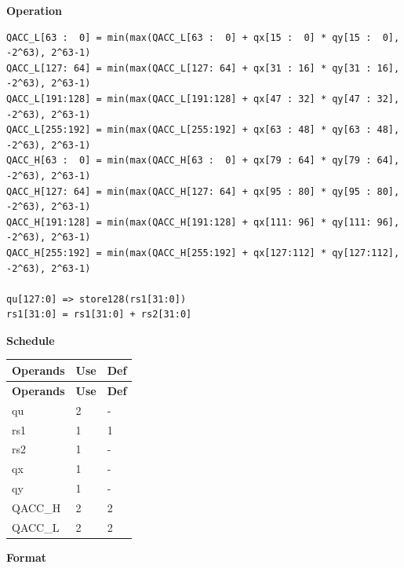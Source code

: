 \textbf{Operation}\\
\begin{lstlisting}
QACC_L[63 :  0] = min(max(QACC_L[63 :  0] + qx[15 :  0] * qy[15 :  0], -2^63), 2^63-1)
QACC_L[127: 64] = min(max(QACC_L[127: 64] + qx[31 : 16] * qy[31 : 16], -2^63), 2^63-1)
QACC_L[191:128] = min(max(QACC_L[191:128] + qx[47 : 32] * qy[47 : 32], -2^63), 2^63-1)
QACC_L[255:192] = min(max(QACC_L[255:192] + qx[63 : 48] * qy[63 : 48], -2^63), 2^63-1)
QACC_H[63 :  0] = min(max(QACC_H[63 :  0] + qx[79 : 64] * qy[79 : 64], -2^63), 2^63-1)
QACC_H[127: 64] = min(max(QACC_H[127: 64] + qx[95 : 80] * qy[95 : 80], -2^63), 2^63-1)
QACC_H[191:128] = min(max(QACC_H[191:128] + qx[111: 96] * qy[111: 96], -2^63), 2^63-1)
QACC_H[255:192] = min(max(QACC_H[255:192] + qx[127:112] * qy[127:112], -2^63), 2^63-1)

qu[127:0] => store128(rs1[31:0])
rs1[31:0] = rs1[31:0] + rs2[31:0]
\end{lstlisting}

\textbf{Schedule}\\
\begin{longtable}[c]{|l|l|l|}
    \hline
    \rowcolor{lightgray}
    \textbf{Operands} & \textbf{Use} & \textbf{Def} \\\hline
    \endfirsthead
    \hline
    \rowcolor{lightgray}
     \textbf{Operands} & \textbf{Use} & \textbf{Def} \\\hline
    \endhead
    \hline
    \endfoot

    qu & 2 & - \\\hline
    rs1 & 1 & 1 \\\hline
    rs2 & 1 & - \\\hline
     qx & 1 & - \\\hline
     qy & 1 & - \\\hline
     QACC\_H & 2 & 2 \\\hline
     QACC\_L & 2 & 2

\end{longtable}

\textbf{Format}\\

